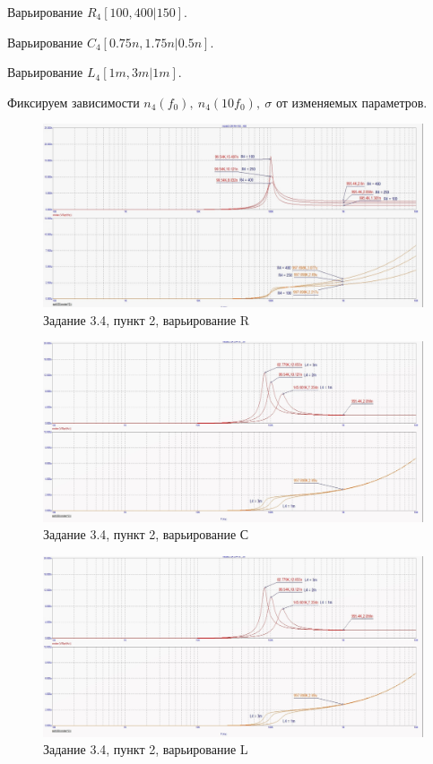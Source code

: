 \documentclass[a4paper, 14pt]{extarticle}%
\begin{document}
Варьирование $R_4[100, 400 | 150]$.

Варьирование $C_4[0.75n, 1.75n | 0.5n]$.

Варьирование $L_4[1m, 3m | 1m]$.

Фиксируем зависимости $n_4(f_0), \: n_4(10f_0), \: \sigma$ от изменяемых параметров.

\begin{figure}[h!]
			\centering
			\includegraphics[width=1.1\linewidth]{3/3_4_3.jpg}
			\caption{Задание 3.4, пункт 2, варьирование R}
			\label{A}
\end{figure}


\begin{figure}[h!]
			\centering
			\includegraphics[width=1.1\linewidth]{3/3_4_2.jpg}
			\caption{Задание 3.4, пункт 2, варьирование С}
			\label{A}
\end{figure}


\begin{figure}[h!]
			\centering
			\includegraphics[width=1.1\linewidth]{3/3_4_2.jpg}
			\caption{Задание 3.4, пункт 2, варьирование L}
			\label{A}
\end{figure}
\end{document}

